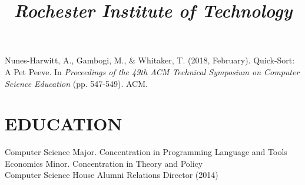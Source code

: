 \documentclass[line,margin,12pt]{resume}
\begin{document}
\begin{resume}
        Nunes-Harwitt, A., Gambogi, M., \& Whitaker, T. (2018, February).
        Quick-Sort: A Pet Peeve.
        In \textit{Proceedings of the 49th ACM Technical Symposium on Computer Science Education} (pp. 547-549). ACM.

        \section{EDUCATION}

        \title{\textit{Rochester Institute of Technology}}
        \begin{position}
            Computer Science Major. Concentration in Programming Language and Tools \\
            Economics Minor. Concentration in Theory and Policy\\
            Computer Science House Alumni Relations Director (2014)
        \end{position}

    \end{resume}
    
\end{document}
